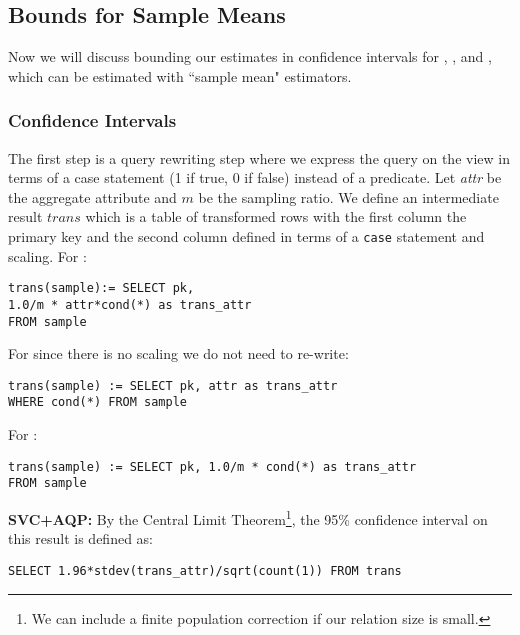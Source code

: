 \subsection{Bounds for Sample Means}
Now we will discuss bounding our estimates in confidence intervals for \sumfunc, \countfunc, and \avgfunc, which can be
estimated with ``sample mean" estimators.

\subsubsection{Confidence Intervals}
The first step is a query rewriting step where we express the query on the view in terms of a \textsf{case} statement (1 if true, 0 if false)
instead of a predicate.
Let \emph{attr} be the aggregate attribute and $m$ be the sampling ratio. 
We define an intermediate result $trans$ which is a table of transformed rows with the first column the 
primary key and the second column defined in terms of a \texttt{case} statement and scaling.
For \sumfunc:
\begin{lstlisting}[mathescape,basicstyle={\scriptsize}]
trans(sample):= SELECT pk, 
1.0/m * attr*cond(*) as trans_attr
FROM sample
\end{lstlisting}
For \avgfunc since there is no scaling we do not need to re-write:
\begin{lstlisting}[mathescape,basicstyle={\scriptsize}]
trans(sample) := SELECT pk, attr as trans_attr 
WHERE cond(*) FROM sample
\end{lstlisting}
For \countfunc:
\begin{lstlisting}[mathescape,basicstyle={\scriptsize}]
trans(sample) := SELECT pk, 1.0/m * cond(*) as trans_attr
FROM sample
\end{lstlisting}

\vspace{0.25em}

\noindent\textbf{SVC+AQP: } By the Central Limit Theorem\footnote{We can include a finite population correction if our relation size is small.}, the 95\% confidence interval on this result is defined 
as:
\begin{lstlisting}[mathescape,basicstyle={\scriptsize}]
SELECT 1.96*stdev(trans_attr)/sqrt(count(1)) FROM trans
\end{lstlisting}

\vspace{0.25em}

